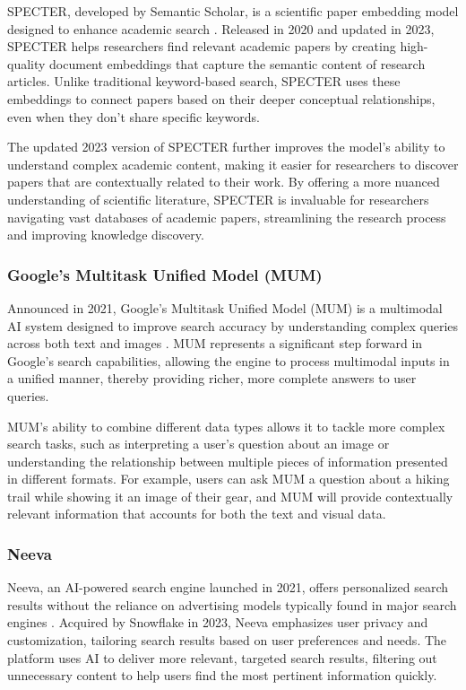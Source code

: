 SPECTER, developed by Semantic Scholar, is a scientific paper embedding model designed to enhance academic search \cite{SPECTER}. 
Released in 2020 and updated in 2023, SPECTER helps researchers find relevant academic papers by creating high-quality document embeddings that capture the semantic content of research articles. 
Unlike traditional keyword-based search, SPECTER uses these embeddings to connect papers based on their deeper conceptual relationships, even when they don't share specific keywords.

The updated 2023 version of SPECTER further improves the model's ability to understand complex academic content, making it easier for researchers to discover papers that are contextually related to their work. 
By offering a more nuanced understanding of scientific literature, SPECTER is invaluable for researchers navigating vast databases of academic papers, streamlining the research process and improving knowledge discovery.

\subsubsection{Google's Multitask Unified Model (MUM)}

Announced in 2021, Google's Multitask Unified Model (MUM) is a multimodal AI system designed to improve search accuracy by understanding complex queries across both text and images \cite{GoogleMUM}. 
MUM represents a significant step forward in Google's search capabilities, allowing the engine to process multimodal inputs in a unified manner, thereby providing richer, more complete answers to user queries.

MUM's ability to combine different data types allows it to tackle more complex search tasks, such as interpreting a user's question about an image or understanding the relationship between multiple pieces of information presented in different formats. 
For example, users can ask MUM a question about a hiking trail while showing it an image of their gear, and MUM will provide contextually relevant information that accounts for both the text and visual data.

\subsubsection{Neeva}

Neeva, an AI-powered search engine launched in 2021, offers personalized search results without the reliance on advertising models typically found in major search engines \cite{Neeva}. 
Acquired by Snowflake in 2023, Neeva emphasizes user privacy and customization, tailoring search results based on user preferences and needs. 
The platform uses AI to deliver more relevant, targeted search results, filtering out unnecessary content to help users find the most pertinent information quickly.

